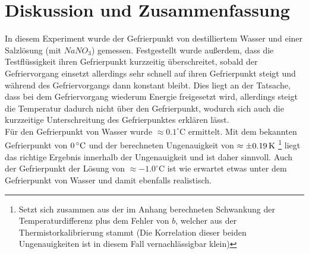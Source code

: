 \section{Diskussion und Zusammenfassung}
In diesem Experiment wurde der Gefrierpunkt von destilliertem Wasser und einer Salzlösung (mit $NaNO_3$) gemessen. Festgestellt wurde außerdem, dass die Testflüssigkeit ihren Gefrierpunkt kurzzeitig überschreitet, sobald der Gefriervorgang einsetzt allerdings sehr schnell auf ihren Gefrierpunkt steigt und während des Gefriervorgangs dann konstant bleibt. Dies liegt an der Tatsache, dass bei dem Gefriervorgang wiederum Energie freigesetzt wird, allerdings steigt die Temperatur dadurch nicht über den Gefrierpunkt, wodurch sich auch die kurzzeitige Unterschreitung des Gefrierpunktes erklären lässt.\\
Für den Gefrierpunkt von Wasser wurde $\approx 0.1^\circ $C ermittelt. Mit dem bekannten Gefrierpunkt von $\unit[0]{^\circ C}$ und der berechneten Ungenauigkeit von $\approx \pm \unit[0.19]{K}$ \footnote{Setzt sich zusammen aus der im Anhang berechneten Schwankung der Temperaturdifferenz plus dem Fehler von $b$, welcher aus der Thermistorkalibrierung stammt (Die Korrelation dieser beiden Ungenauigkeiten ist in diesem Fall vernachlässigbar klein)} liegt das richtige Ergebnis innerhalb der Ungenauigkeit und ist daher sinnvoll. Auch der Gefrierpunkt der Lösung von $\approx -1.0^\circ$C ist wie erwartet etwas unter dem Gefrierpunkt von Wasser und damit ebenfalls realistisch.







